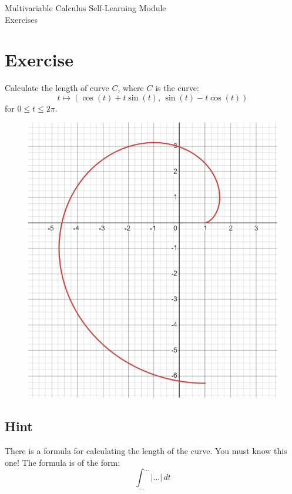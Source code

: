 \documentclass[a4paper,10pt]{article}
\begin{document}
\begingroup
\centering
\LARGE Multivariable Calculus Self-Learning Module\\[1em]
\large Exercises\par
\vspace{32pt}
\endgroup

\tableofcontents

\clearpage

\section{Exercise}

Calculate the length of curve $C$, where $C$ is the curve:
\[
    t \mapsto (\cos(t) + t\sin(t), \, \sin(t) - t\cos(t))
\]
for $0\leq t \leq 2\pi$.

\begin{figure}[!ht]
    \centering
    \includegraphics[scale=0.5]{ex_1.png}
\end{figure}

\subsection{Hint}
There is a formula for calculating the length of the curve. You must know this one! The formula is of the form:
\[
    \int_{\ldots}^{\ldots} |\ldots|\,dt
\]
\end{document}
